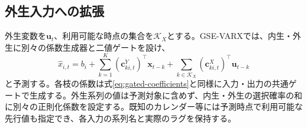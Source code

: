 \subsection{外生入力への拡張}
外生変数を\(\bm u_t\)、利用可能な時点の集合を\(\mathcal K_X\)とする。GSE-VARXでは、内生・外生に別々の係数生成器と二値ゲートを設け、
\begin{equation}
 \widehat x_{i,t}=b_i+\sum_{k=1}^{K}(\bm c^{Y}_{ki,t})^\top\bm x_{t-k}
 +\sum_{k\in\mathcal K_X}(\bm c^{X}_{ki,t})^\top\bm u_{t-k}
\end{equation}
と予測する。各枝の係数は式\eqref{eq:gated-coefficients}と同様に入力・出力の共通ゲートで生成する。外生系列の値は予測対象に含めず、内生・外生の選択確率の和に別々の正則化係数を設定する。既知のカレンダー等には予測時点で利用可能な先行値も指定でき、各入力の系列名と実際のラグを保持する。
